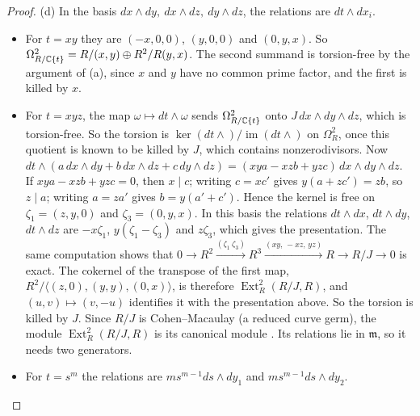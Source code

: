 \begin{proof}
(d) In the basis $dx\wedge dy,\ dx\wedge dz,\ dy\wedge dz$, the relations are $dt\wedge dx_i$.
\begin{itemize}
\item For $t=xy$ they are $(-x,0,0)$, $(y,0,0)$ and $(0,y,x)$. So $\Omega^2_{R/\mathbb{C}\{t\}}=R/(x,y)\oplus R^2/R(y,x)$. The second summand is torsion-free by the argument of (a), since $x$ and $y$ have no common prime factor, and the first is killed by $x$.
\item For $t=xyz$, the map $\omega\mapsto dt\wedge\omega$ sends $\Omega^2_{R/\mathbb{C}\{t\}}$ onto $J\,dx\wedge dy\wedge dz$, which is torsion-free. So the torsion is $\ker(dt\wedge)/\operatorname{im}(dt\wedge)$ on $\Omega^2_R$, once this quotient is known to be killed by $J$, which contains nonzerodivisors. Now $dt\wedge(a\,dx\wedge dy+b\,dx\wedge dz+c\,dy\wedge dz)=(xya-xzb+yzc)\,dx\wedge dy\wedge dz$. If $xya-xzb+yzc=0$, then $x\mid c$; writing $c=xc'$ gives $y(a+zc')=zb$, so $z\mid a$; writing $a=za'$ gives $b=y(a'+c')$. Hence the kernel is free on $\zeta_1=(z,y,0)$ and $\zeta_3=(0,y,x)$. In this basis the relations $dt\wedge dx$, $dt\wedge dy$, $dt\wedge dz$ are $-x\zeta_1$, $y(\zeta_1-\zeta_3)$ and $z\zeta_3$, which gives the presentation. The same computation shows that $0\to R^2\xrightarrow{(\zeta_1\ \zeta_3)}R^3\xrightarrow{(xy,\,-xz,\,yz)}R\to R/J\to0$ is exact. The cokernel of the transpose of the first map, $R^2/\langle(z,0),(y,y),(0,x)\rangle$, is therefore $\operatorname{Ext}^2_R(R/J,R)$, and $(u,v)\mapsto(v,-u)$ identifies it with the presentation above. So the torsion is killed by $J$. Since $R/J$ is Cohen--Macaulay (a reduced curve germ), the module $\operatorname{Ext}^2_R(R/J,R)$ is its canonical module \cite[§3.3]{BH93}. Its relations lie in $\mathfrak m$, so it needs two generators.
\item For $t=s^m$ the relations are $ms^{m-1}ds\wedge dy_1$ and $ms^{m-1}ds\wedge dy_2$.
\end{itemize}
\end{proof}

